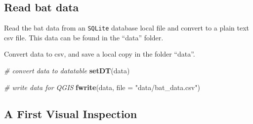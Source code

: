 \documentclass[]{scrartcl}
\newenvironment{Shaded}{}{}
\newcommand{\CharTok}[1]{\textcolor[rgb]{0.25,0.44,0.63}{#1}}
\newcommand{\CommentTok}[1]{\textcolor[rgb]{0.38,0.63,0.69}{\textit{#1}}}
\newcommand{\DataTypeTok}[1]{\textcolor[rgb]{0.56,0.13,0.00}{#1}}
\newcommand{\KeywordTok}[1]{\textcolor[rgb]{0.00,0.44,0.13}{\textbf{#1}}}
\newcommand{\NormalTok}[1]{#1}
\newcommand{\StringTok}[1]{\textcolor[rgb]{0.25,0.44,0.63}{#1}}
\begin{document}
\hypertarget{read-bat-data}{%
\subsection{Read bat data}\label{read-bat-data}}

Read the bat data from an \texttt{SQLite} database local file and convert to a plain text csv file.
This data can be found in the ``data'' folder.

\begin{Shaded}
\end{Shaded}

Convert data to csv, and save a local copy in the folder ``data''.

\begin{Shaded}
\begin{Highlighting}[]
\CommentTok{# convert data to datatable}
\KeywordTok{setDT}\NormalTok{(data)}

\CommentTok{# write data for QGIS}
\KeywordTok{fwrite}\NormalTok{(data, }\DataTypeTok{file =} \StringTok{"data/bat_data.csv"}\NormalTok{)}
\end{Highlighting}
\end{Shaded}

\hypertarget{a-first-visual-inspection}{%
\subsection{A First Visual Inspection}\label{a-first-visual-inspection}}
\end{document}
